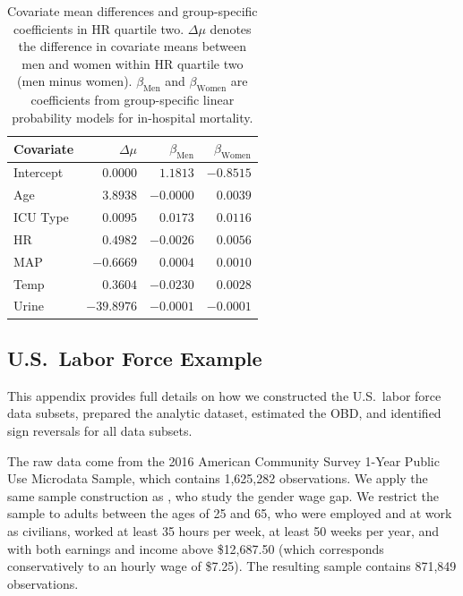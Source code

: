 \begin{table}[!ht]
    \caption{Covariate mean differences and group-specific coefficients in HR quartile two. $\Delta\mu$ denotes the difference in covariate means between men and women within HR quartile two (men minus women). $\beta_{\text{Men}}$ and $\beta_{\text{Women}}$ are coefficients from group-specific linear probability models for in-hospital mortality.}
    \label{tab:delta_mu_betas}
    \centering
    \small
    \begin{tabular}{lrrr}
    \toprule
    Covariate 
    & $\Delta\mu$ 
    & $\beta_{\text{Men}}$ 
    & $\beta_{\text{Women}}$ \\
    \midrule
    Intercept & $0.0000$   & $1.1813$  & $-0.8515$ \\
    Age       & $3.8938$   & $-0.0000$ & $0.0039$ \\
    ICU Type  & $0.0095$   & $0.0173$  & $0.0116$ \\
    HR        & $0.4982$   & $-0.0026$ & $0.0056$ \\
    MAP       & $-0.6669$  & $0.0004$  & $0.0010$ \\
    Temp      & $0.3604$   & $-0.0230$ & $0.0028$ \\
    Urine     & $-39.8976$ & $-0.0001$ & $-0.0001$ \\
    \bottomrule
    \end{tabular}
\end{table}
    
\subsection{U.S.\ Labor Force Example}
\label{appendix:us_labor_force}
This appendix provides full details on how we constructed the U.S.\ labor force data subsets, prepared the analytic dataset, estimated the OBD, and identified sign reversals for all data subsets. %
 
The raw data come from the 2016 American Community Survey 1-Year Public Use Microdata Sample, which contains 1,625,282 observations.
We apply the same sample construction as \citet{bach2024heterogeneity}, who study the gender wage gap.
We restrict the sample to adults between the ages of 25 and 65, who were employed and at work as civilians, worked at least 35 hours per week, at least 50 weeks per year, and with both earnings and income above \$12,687.50 (which corresponds conservatively to an hourly wage of \$7.25).
The resulting sample contains 871,849 observations.

